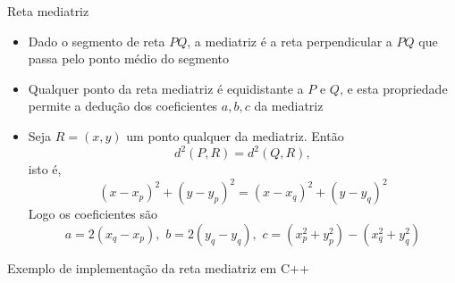 \begin{frame}[fragile]{Reta mediatriz}

    \begin{itemize}
        \item Dado o segmento de reta $PQ$, a mediatriz é a reta perpendicular a $PQ$ que passa
            pelo ponto médio do segmento
        \pause

        \item Qualquer ponto da reta mediatriz é equidistante a $P$ e $Q$, e esta propriedade
            permite a dedução dos coeficientes $a, b, c$ da mediatriz
        \pause

        \item Seja $R = (x, y)$ um ponto qualquer da mediatriz. Então
        \[
            d^2(P, R) = d^2(Q, R),
        \]
        isto é,
        \[
            (x - x_p)^2 + (y - y_p)^2 = (x - x_q)^2 + (y - y_q)^2
        \]
        Logo os coeficientes são
        \[
            a = 2(x_q - x_p), \, \, b = 2(y_q - y_q), \, \, c = (x_p^2 + y_p^2) - (x_q^2 + y_q^2)
        \]
    \end{itemize}

\end{frame}

\begin{frame}[fragile]{Exemplo de implementação da reta mediatriz em C++}
\end{frame}

